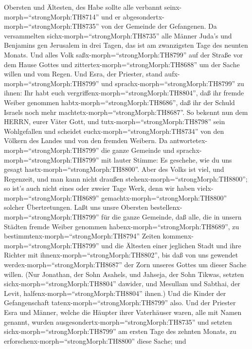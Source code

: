 Obersten und Ältesten, des Habe sollte alle verbannt
seinx-morph=``strongMorph:TH8714'' und er
abgesondertx-morph=``strongMorph:TH8735'' von der Gemeinde der
Gefangenen.  Da versammelten
sichx-morph=``strongMorph:TH8735'' alle Männer Juda's und Benjamins gen
Jerusalem in drei Tagen, das ist am zwanzigsten Tage des neunten Monats.
Und alles Volk saßx-morph=``strongMorph:TH8799'' auf der Straße vor dem
Hause Gottes und zittertex-morph=``strongMorph:TH8688'' um der Sache
willen und vom Regen.  Und Esra, der Priester, stand
aufx-morph=``strongMorph:TH8799'' und
sprachx-morph=``strongMorph:TH8799'' zu ihnen: Ihr habt euch
vergriffenx-morph=``strongMorph:TH8804'', daß ihr fremde Weiber genommen
habtx-morph=``strongMorph:TH8686'', daß ihr der Schuld Israels noch mehr
machtetx-morph=``strongMorph:TH8687''.  So bekennt nun dem
HERRN, eurer Väter Gott, und tutx-morph=``strongMorph:TH8798'' sein
Wohlgefallen und scheidet euchx-morph=``strongMorph:TH8734'' von den
Völkern des Landes und von den fremden Weibern.  Da
antwortetex-morph=``strongMorph:TH8799'' die ganze Gemeinde und
sprachx-morph=``strongMorph:TH8799'' mit lauter Stimme: Es geschehe, wie
du uns gesagt hastx-morph=``strongMorph:TH8800''.  Aber des
Volks ist viel, und Regenzeit, und man kann nicht draußen
stehenx-morph=``strongMorph:TH8800''; so ist's auch nicht eines oder
zweier Tage Werk, denn wir haben vielx-morph=``strongMorph:TH8689''
gemachtx-morph=``strongMorph:TH8800'' solcher Übertretungen.
 Laßt uns unsre Obersten
bestellenx-morph=``strongMorph:TH8799'' für die ganze Gemeinde, daß
alle, die in unsern Städten fremde Weiber genommen
habenx-morph=``strongMorph:TH8689'', zu
bestimmtenx-morph=``strongMorph:TH8794'' Zeiten
kommenx-morph=``strongMorph:TH8799'' und die Ältesten einer jeglichen
Stadt und ihre Richter mit ihnenx-morph=``strongMorph:TH8802'', bis daß
von uns gewendet werdex-morph=``strongMorph:TH8687'' der Zorn unseres
Gottes um dieser Sache willen.  (Nur Jonathan, der Sohn
Asahels, und Jahseja, der Sohn Tikwas, setzten
sichx-morph=``strongMorph:TH8804'' dawider, und Mesullam und Sabthai,
der Levit, halfenx-morph=``strongMorph:TH8804'' ihnen.) 
Und die Kinder der Gefangenschaft tatenx-morph=``strongMorph:TH8799''
also. Und der Priester Esra und Männer, welche die Häupter ihrer
Vaterhäuser waren, alle mit Namen genannt, wurden
ausgesondertx-morph=``strongMorph:TH8735'' und setzten
sichx-morph=``strongMorph:TH8799'' am ersten Tage des zehnten Monats, zu
erforschenx-morph=``strongMorph:TH8800'' diese Sache;  und
